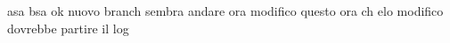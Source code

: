 \documentclass{article}
\begin{document}
asa
bsa
ok nuovo branch
sembra andare
ora modifico questo
ora ch elo modifico dovrebbe partire il log
\end{document}
